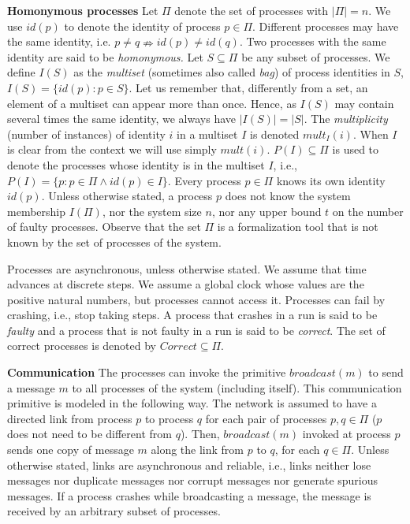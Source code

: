 \documentclass[10pt, conference, compsocconf]{IEEEtran}
\newcommand{\tightparagraph}[1]{\smallskip \noindent \textbf{#1} \hspace{1ex}}
\newcommand{\C}{{\mathit{Correct}}}
\begin{document}
\tightparagraph{Homonymous processes} 
Let $\Pi$ denote the set of processes with  $|\Pi|=n$.
 We use  $id(p)$ to denote the identity  of process  $p \in \Pi$.  
Different processes may  have the
same  identity,  i.e. $p  \neq  q  \nRightarrow  id(p) \neq  id(q)$.  Two
processes with the same identity are said to be \emph{homonymous.}   
Let $S \subseteq  \Pi$ be any subset of processes. We  define $I(S)$ as the
\emph{multiset} (sometimes also called {\it bag}) of process identities  
in $S$,  $I(S) =  \{id(p) :  p \in S\}$. Let us remember that, differently
from a set, an element of a multiset can appear more than once. 
Hence, as  $I(S)$ may contain several  times the same   identity, 
we always have $|I(S)|=|S|$.  
The  \emph{multiplicity}   (number  of   instances)  of
identity    $i$   in    a    multiset   $I$ is  denoted   
$\mathit{mult}_I(i)$. When $I$ is clear from the context we will use simply
$\mathit{mult}(i)$.     $P(I) \subseteq  \Pi$ is used to denote
the  processes whose  identity is in the multiset $I$, i.e., 
$P(I)=\{p: p  \in \Pi \wedge id(p) \in I\}$. 
Every  process  $p \in \Pi$  knows  its   own identity
$id(p)$. Unless  otherwise stated, a process  $p$ does not  know the system
membership $I(\Pi)$, nor the system size $n$, nor any upper bound $t$ on the 
number of faulty processes. Observe that the set $\Pi$ is
a formalization tool that is not known by the set of processes of the system. 


Processes are  asynchronous, unless otherwise  stated. We assume  that time
advances at discrete  steps. We assume a global clock  whose values are the
positive natural numbers, but processes cannot access it. 
Processes can  fail by  crashing, i.e.,   stop taking steps. 
A process that  crashes in a run is said to  be \emph{faulty} and a
process that is not  faulty in a run is said to  be \emph{correct}. 
The set of correct processes is denoted by $\C \subseteq \Pi$. 


\tightparagraph{Communication}
The processes can invoke the primitive $broadcast(m)$ to send a message
$m$ to all  processes of the system (including  itself). This communication
primitive is modeled in the following way. The network is assumed to have a
directed link  from process $p$ to  process $q$ for each  pair of processes
$p,q  \in  \Pi$  ($p$ does  not  need  to  be  different from  $q$).  Then,
$broadcast(m)$ invoked at  process $p$ sends one copy  of message $m$ along
the link  from $p$ to $q$, for  each $q \in \Pi$.  Unless otherwise stated,
links are asynchronous and reliable,  i.e., links neither lose messages nor
duplicate messages nor corrupt  messages nor generate spurious messages. If
a process crashes while broadcasting a message, the message is received
by an arbitrary  subset of processes.  
\end{document}

